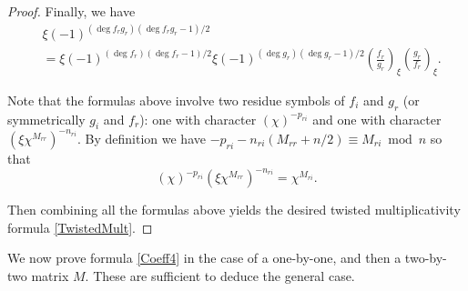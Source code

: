 \documentclass[11pt,letterpaper]{article}
\theoremstyle{definition}
\theoremstyle{remark}
\numberwithin{equation}{section}
\theoremstyle{dotless}
\newcommand{\res}[2]{\left(\frac{#1}{#2}\right)}
\begin{document}
\begin{proof}
Finally, we have 
\begin{equation*}
\begin{split}
&\xi(-1)^{(\deg f_rg_r)(\deg f_rg_r-1)/2} \\
&= \xi(-1)^{(\deg f_r)(\deg f_r-1)/2}\xi(-1)^{(\deg g_r)(\deg g_r-1)/2} \res{f_r}{g_r}_{\xi}\res{g_r}{f_r}_{\xi}.
\end{split}
\end{equation*}

Note that the formulas above involve two residue symbols of $f_i$ and $g_r$ (or symmetrically $g_i$ and $f_r$): one with character $(\chi)^{-p_{ri}}$ and one with character $(\xi \chi^{M_{rr}})^{-n_{ri}}$. By definition we have $-p_{ri}-n_{ri}(M_{rr}+n/2) \equiv M_{ri} \bmod n$ so that
\begin{equation} \label{CharacterEquality}
(\chi)^{-p_{ri}} (\xi \chi^{M_{rr}})^{-n_{ri}} = \chi^{M_{ri}}.
\end{equation}

Then combining all the formulas above yields the desired twisted multiplicativity formula \eqref{TwistedMult}. 
\end{proof}

We now prove formula \eqref{Coeff4} in the case of a one-by-one, and then a two-by-two matrix $M$. These are sufficient to deduce the general case. 
\end{document}
